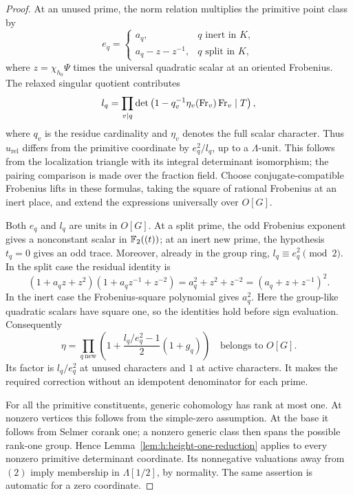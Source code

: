 \begin{proof}
At an unused prime, the norm relation multiplies the primitive point
class by
\[
 e_q=\begin{cases}
 a_q,&q\text{ inert in }K,\\
 a_q-z-z^{-1},&q\text{ split in }K,
 \end{cases}
\]
where $z=\chi_{h_0}\Psi$ times the universal quadratic scalar at an
oriented Frobenius. The relaxed singular quotient contributes
\[
 l_q=\prod_{v\mid q}
  \det\left(1-q_v^{-1}\eta_v(\operatorname{Fr}_v)\operatorname{Fr}_v\mid T\right),
\]
where $q_v$ is the residue cardinality and $\eta_v$ denotes the full
scalar character. Thus $u_{\mathrm{rel}}$ differs from the primitive
coordinate by $e_q^2/l_q$, up to a $\Lambda$-unit. This follows from
the localization triangle with its integral determinant isomorphism;
the pairing comparison is made over the fraction field. Choose
conjugate-compatible Frobenius lifts in these formulas, taking the
square of rational Frobenius at an inert place, and extend the
expressions universally over $O[G]$.

Both $e_q$ and $l_q$ are units in $O[G]$. At a split prime, the odd
Frobenius exponent gives a nonconstant scalar in $\mathbb F_2((t))$; at an
inert new prime, the hypothesis $t_q=0$ gives an odd trace. Moreover,
already in the group ring,
$l_q\equiv e_q^2\pmod2$. In the split case the residual identity is
\[
 (1+a_qz+z^2)(1+a_qz^{-1}+z^{-2})
       =a_q^2+z^2+z^{-2}=(a_q+z+z^{-1})^2.
\]
In the inert case the Frobenius-square polynomial gives $a_q^2$.
Here the group-like quadratic scalars have square one, so the identities
hold before sign evaluation. Consequently
\begin{equation}\label{eq:h:group-ring-correction}
 \eta=\prod_{q\ \mathrm{new}}
  \left(1+\frac{l_q/e_q^2-1}{2}(1+g_q)\right)
       \quad\text{belongs to }O[G].
\end{equation}
Its factor is $l_q/e_q^2$ at unused characters and $1$ at active
characters. It makes the required correction without an idempotent
denominator for each prime.

For all the primitive constituents, generic cohomology has rank at
most one. At nonzero vertices this follows from the simple-zero
assumption. At the base it follows from Selmer corank one; a nonzero
generic class then spans the possible rank-one group. Hence
Lemma~\ref{lem:h:height-one-reduction} applies to every nonzero
primitive determinant coordinate. Its nonnegative valuations away
from $(2)$ imply membership in $\Lambda[1/2]$, by normality. The
same assertion is automatic for a zero coordinate.


\end{proof}
